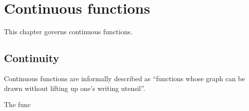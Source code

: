 \chapter{Continuous functions}

This chapter governs continuous functions.

\section{Continuity}

Continuous functions are informally described as ``functions whose graph can be
drawn without lifting up one's writing utensil''.

The func

\begin{appendices}
\end{appendices}